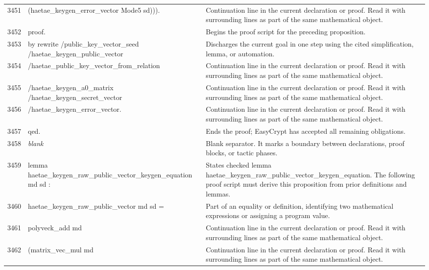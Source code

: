 \documentclass[10pt]{article}
\begin{document}
\begin{longtable}{r L{0.53\textwidth} L{0.37\textwidth}}
3451 & {\ttfamily\scriptsize         (haetae\_keygen\_error\_vector Mode5 sd))).} & Continuation line in the current declaration or proof.  Read it with surrounding lines as part of the same mathematical object. \\
3452 & {\ttfamily\scriptsize proof.} & Begins the proof script for the preceding proposition. \\
3453 & {\ttfamily\scriptsize by rewrite /public\_key\_vector\_seed /haetae\_keygen\_public\_vector} & Discharges the current goal in one step using the cited simplification, lemma, or automation. \\
3454 & {\ttfamily\scriptsize            /haetae\_public\_key\_vector\_from\_relation} & Continuation line in the current declaration or proof.  Read it with surrounding lines as part of the same mathematical object. \\
3455 & {\ttfamily\scriptsize            /haetae\_keygen\_a0\_matrix /haetae\_keygen\_secret\_vector} & Continuation line in the current declaration or proof.  Read it with surrounding lines as part of the same mathematical object. \\
3456 & {\ttfamily\scriptsize            /haetae\_keygen\_error\_vector.} & Continuation line in the current declaration or proof.  Read it with surrounding lines as part of the same mathematical object. \\
3457 & {\ttfamily\scriptsize qed.} & Ends the proof; EasyCrypt has accepted all remaining obligations. \\
3458 & {\ttfamily\scriptsize \emph{blank}} & Blank separator.  It marks a boundary between declarations, proof blocks, or tactic phases. \\
3459 & {\ttfamily\scriptsize lemma haetae\_keygen\_raw\_public\_vector\_keygen\_equation md sd :} & States checked lemma haetae\_keygen\_raw\_public\_vector\_keygen\_equation.  The following proof script must derive this proposition from prior definitions and lemmas. \\
3460 & {\ttfamily\scriptsize   haetae\_keygen\_raw\_public\_vector md sd =} & Part of an equality or definition, identifying two mathematical expressions or assigning a program value. \\
3461 & {\ttfamily\scriptsize   polyveck\_add md} & Continuation line in the current declaration or proof.  Read it with surrounding lines as part of the same mathematical object. \\
3462 & {\ttfamily\scriptsize     (matrix\_vec\_mul md} & Continuation line in the current declaration or proof.  Read it with surrounding lines as part of the same mathematical object. \\

\end{longtable}
\end{document}
